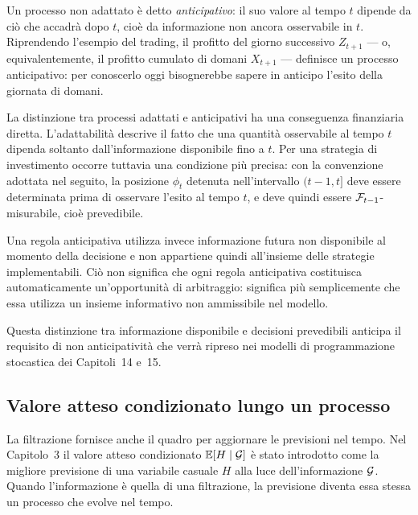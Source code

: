 Un processo non adattato \`{e} detto \emph{anticipativo}: il suo
valore al tempo $t$ dipende da ci\`{o} che accadr\`{a} dopo $t$,
cio\`{e} da informazione non ancora osservabile in $t$. Riprendendo
l'esempio del trading, il profitto del giorno successivo $Z_{t+1}$
--- o, equivalentemente, il profitto cumulato di domani $X_{t+1}$ ---
definisce un processo anticipativo: per conoscerlo oggi bisognerebbe
sapere in anticipo l'esito della giornata di domani.

\begin{remark}
La distinzione tra processi adattati e anticipativi ha una
conseguenza finanziaria diretta. L'adattabilit\`{a} descrive il fatto
che una quantit\`{a} osservabile al tempo $t$ dipenda soltanto
dall'informazione disponibile fino a $t$. Per una strategia di
investimento occorre tuttavia una condizione pi\`{u} precisa: con la
convenzione adottata nel seguito, la posizione $\phi_t$ detenuta
nell'intervallo $(t-1,t]$ deve essere determinata prima di osservare
l'esito al tempo $t$, e deve quindi essere $\mathcal{F}_{t-1}$-misurabile,
cio\`{e} prevedibile.

Una regola anticipativa utilizza invece informazione futura non
disponibile al momento della decisione e non appartiene quindi
all'insieme delle strategie implementabili. Ci\`{o} non significa
che ogni regola anticipativa costituisca automaticamente
un'opportunit\`{a} di arbitraggio: significa pi\`{u} semplicemente
che essa utilizza un insieme informativo non ammissibile nel modello.

Questa distinzione tra informazione disponibile e decisioni
prevedibili anticipa il requisito di non anticipativit\`{a} che
verr\`{a} ripreso nei modelli di programmazione stocastica dei
Capitoli~14 e~15.
\end{remark}

\subsection{Valore atteso condizionato lungo un processo}

\noindent
La filtrazione fornisce anche il quadro per aggiornare le previsioni
nel tempo. Nel Capitolo~3 il valore atteso condizionato $\mathbb{E}[H\mid\mathcal{G}]$
\`{e} stato introdotto come la migliore previsione di una variabile
casuale $H$ alla luce dell'informazione $\mathcal{G}$. Quando l'informazione
\`{e} quella di una filtrazione, la previsione diventa essa stessa un
processo che evolve nel tempo.

